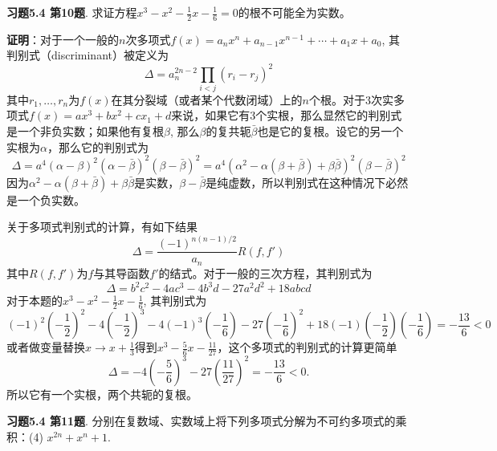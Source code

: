 
\renewcommand{\newpageorvspace}{\vspace{2em}}

\date{2021-12-24  第七次习题课}



\maketitle

{\bf 习题5.4 第10题}. 求证方程$x^3 - x^2 - \frac{1}{2}x - \frac{1}{6} = 0$的根不可能全为实数。

{\bf 证明}：对于一个一般的$n$次多项式$f(x) = a_{n}x^{n}+a_{n-1}x^{n-1}+\cdots +a_{1}x+a_{0}$, 其判别式（discriminant）被定义为
$$\Delta = a_n^{2n-2} \prod_{i< j} (r_i - r_j)^2$$
其中$r_1,\ldots, r_n$为$f(x)$在其分裂域（或者某个代数闭域）上的$n$个根。对于3次实多项式$f(x) = ax^3+bx^2+cx_1+d$来说，如果它有3个实根，那么显然它的判别式是一个非负实数；如果他有复根$\beta$, 那么$\beta$的复共轭$\bar{\beta}$也是它的复根。设它的另一个实根为$\alpha$，那么它的判别式为
$$\Delta = a^4 (\alpha-\beta)^2(\alpha-\bar{\beta})^2(\beta-\bar{\beta})^2 = a^4 (\alpha^2-\alpha(\beta+\bar{\beta})+\beta\bar{\beta})^2 (\beta-\bar{\beta})^2$$
因为$\alpha^2-\alpha(\beta+\bar{\beta})+\beta\bar{\beta}$是实数，$\beta-\bar{\beta}$是纯虚数，所以判别式在这种情况下必然是一个负实数。

关于多项式判别式的计算，有如下结果
$$\Delta = \frac{(-1)^{n(n-1)/2}}{a_n} R(f,f')$$
其中$R(f,f')$为$f$与其导函数$f'$的结式。对于一般的三次方程，其判别式为
$$\Delta = b^{2}c^{2}-4ac^{3}-4b^{3}d-27a^{2}d^{2}+18abcd$$
对于本题的$x^3 - x^2 - \frac{1}{2}x - \frac{1}{6}$, 其判别式为
$$(-1)^2(-\frac{1}{2})^2 - 4(-\frac{1}{2})^3 - 4(-1)^3(-\frac{1}{6}) - 27(-\frac{1}{6})^2 + 18(-1)(-\frac{1}{2})(-\frac{1}{6}) = -\frac{13}{6} < 0$$
或者做变量替换$x\to x+\frac{1}{3}$得到$x^{3} - \frac{5}{6}x - \frac{11}{27}$，这个多项式的判别式的计算更简单
$$\Delta = -4(-\frac{5}{6})^3 - 27 (\frac{11}{27})^2 = -\frac{13}{6} < 0.$$
所以它有一个实根，两个共轭的复根。

\newpageorvspace


{\bf 习题5.4 第11题}. 分别在复数域、实数域上将下列多项式分解为不可约多项式的乘积：(4) $x^{2n} + x^n + 1$.

